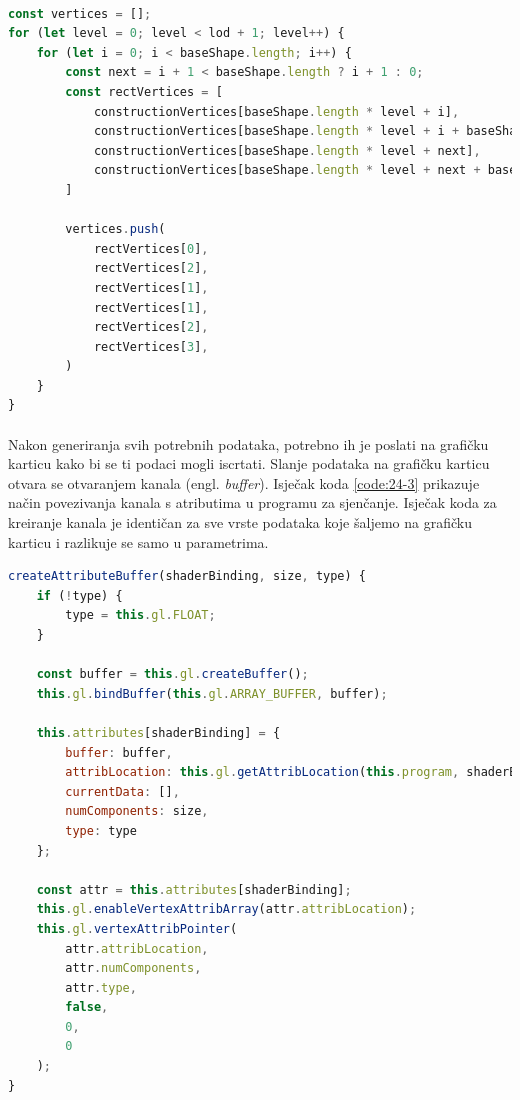 \documentclass[times, utf8, diplomski]{fer}
\begin{document}
\paragraph{}
\begin{lstlisting}[language=Javascript,caption=Generiranje lica od gradivnih točaka,label=code24-2]
const vertices = [];
for (let level = 0; level < lod + 1; level++) {
    for (let i = 0; i < baseShape.length; i++) {
        const next = i + 1 < baseShape.length ? i + 1 : 0;
        const rectVertices = [
            constructionVertices[baseShape.length * level + i],
            constructionVertices[baseShape.length * level + i + baseShape.length],
            constructionVertices[baseShape.length * level + next],
            constructionVertices[baseShape.length * level + next + baseShape.length]
        ]

        vertices.push(
            rectVertices[0],
            rectVertices[2],
            rectVertices[1],
            rectVertices[1],
            rectVertices[2],
            rectVertices[3],
        )
    }
}
\end{lstlisting}

\paragraph{}
Nakon generiranja svih potrebnih podataka, potrebno ih je poslati na grafičku karticu kako bi se ti podaci mogli iscrtati. Slanje podataka na grafičku karticu otvara se otvaranjem kanala (engl. \textit{buffer}). Isječak koda \ref{code:24-3} prikazuje način povezivanja kanala s atributima u programu za sjenčanje. Isječak koda za kreiranje kanala je identičan za sve vrste podataka koje šaljemo na grafičku karticu i razlikuje se samo u parametrima.

\begin{lstlisting}[language=Javascript,caption=Kreiranje kanala za slanje podataka prema grafičkoj kartici ,label=code24-3]
createAttributeBuffer(shaderBinding, size, type) {
    if (!type) {
        type = this.gl.FLOAT;
    }
    
    const buffer = this.gl.createBuffer();
    this.gl.bindBuffer(this.gl.ARRAY_BUFFER, buffer);
    
    this.attributes[shaderBinding] = {
        buffer: buffer,
        attribLocation: this.gl.getAttribLocation(this.program, shaderBinding),
        currentData: [],
        numComponents: size,
        type: type
    };
    
    const attr = this.attributes[shaderBinding];
    this.gl.enableVertexAttribArray(attr.attribLocation);
    this.gl.vertexAttribPointer(
        attr.attribLocation,
        attr.numComponents,
        attr.type,
        false,
        0,
        0
    );
}
\end{lstlisting}
\end{document}
